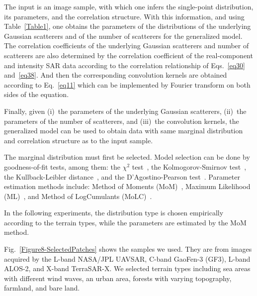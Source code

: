 \documentclass[journal]{IEEEtran}
\begin{document}
The input is an image sample, with which one infers the single-point distribution, its parameters, and the correlation structure.
%
With this information, and using Table~\ref{Table1}, one obtains the parameters of the distributions of the underlying Gaussian scatterers and of the number of scatterers for the generalized model.
%
The correlation coefficients of the underlying Gaussian scatterers and number of scatterers are also determined by the correlation coefficient of the real-component and intensity SAR data according to the correlation relationship of Eqs.~\eqref{eq30} and~\eqref{eq38}.
%
And then the corresponding convolution kernels are obtained according to Eq.~\eqref{eq11} which can be implemented by Fourier transform on both sides of the equation.

Finally, given
(i)~the parameters of the underlying Gaussian scatterers,
(ii)~the parameters of the number of scatterers, and
(iii)~the convolution kernels,
the generalized model can be used to obtain data with same marginal distribution and correlation structure as to the input sample.

The marginal distribution must first be selected.
Model selection can be done by goodness-of-fit tests, among them:
the $\chi^{2}$ test~\cite{Papoulis:2002,Devore:2004},
the Kolmogorov-Smirnov test~\cite{Devore:2004},
the Kullback-Leibler distance~\cite{Kullback:1959}, and
the D'Agostino-Pearson test~\cite{Devore:2004}.
Parameter estimation methods include:
Method of Moments (MoM)~\cite{Papoulis:2002},
Maximum Likelihood (ML)~\cite{Papoulis:2002}, and
Method of LogCumulants (MoLC)~\cite{Nicolas:2002}.

In the following experiments, the distribution type is chosen empirically according to the terrain types, while the parameters are estimated by the MoM method.

Fig.~\ref{Figure8-SelectedPatches} shows the samples we used.
They are from images acquired by the L-band NASA/JPL UAVSAR, C-band GaoFen-3 (GF3), L-band ALOS-2, and X-band TerraSAR-X.
We selected terrain types including
sea areas with different wind waves,
an urban area,
forests with varying topography,
farmland, and bare land.
\end{document}
